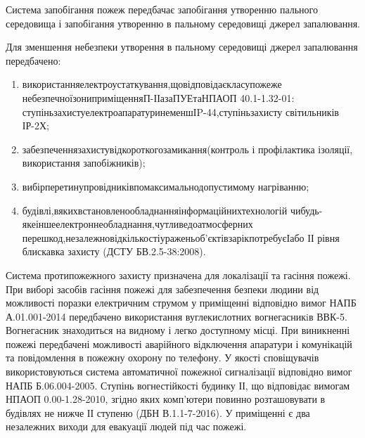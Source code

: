 Система запобігання пожеж передбачає запобігання утворенню пального середовища і запобігання утворенню в пальному середовищі джерел запалювання.

Для зменшення небезпеки утворення в пальному середовищі джерел запалювання передбачено:

\begin{enumerate}
	\item використання\hfill електроустаткування,\hfill що\hfill відповідає\hfill класу\hfill пожеже\newline \hspace*{-18mm} небезпечної\hfill зони\hfill приміщення\hfill П-ІІа\hfill за\hfill ПУЕ\hfill та\hfill НПАОП 40.1-1.32-01:\newline \hspace*{-18mm} ступінь\hfill захисту\hfill електроапаратури\hfill не\hfill менш\hfill ІP-44,\hfill ступінь\hfill захисту\newline \hspace*{-18mm} світильників ІР-2Х;
	\item забезпечення\hfill захисту\hfill від\hfill короткого\hfill замикання\hfill (контроль і\newline \hspace*{-18mm} профілактика ізоляції, використання запобіжників);
	\item вибір\hfill перетину\hfill провідників\hfill по\hfill максимально\hfill допустимому\newline \hspace*{-18mm} нагріванню;
	\item будівлі,\hfill в\hfill яких\hfill встановлено\hfill обладнання\hfill інформаційних\hfill технологій\newline \hspace*{-18mm} чи\hfill будь-яке\hfill інше\hfill електронне\hfill обладнання,\hfill чутливе\hfill до\hfill атмосферних\newline \hspace*{-18mm} перешкод,\hfill незалежно\hfill від\hfill кількості\hfill уражень\hfill об’єктів\hfill за\hfill рік\hfill потребує\hfill І\hfill або\newline \hspace*{-18mm} ІІ рівня блискавка захисту (ДСТУ БВ.2.5-38:2008).
\end{enumerate}

Система протипожежного захисту призначена для локалізації та гасіння пожежі. При виборі засобів гасіння пожежі для забезпечення безпеки людини від можливості поразки електричним струмом у приміщенні відповідно вимог НАПБ А.01.001-2014 передбачено використання вуглекислотних вогнегасникiв ВВК-5. Вогнегасник знаходиться на видному і легко доступному місці. При виникненні пожежі передбачені можливості аварійного відключення апаратури і комунікацій та повідомлення в пожежну охорону по телефону. У якості сповіщувачів використовуються система автоматичної пожежної сигналізації відповідно вимог НАПБ Б.06.004-2005. Ступінь вогнестійкості будинку ІІ, що відповідає вимогам НПАОП 0.00-1.28-2010, згідно яких комп’ютери повинно розташовувати в будівлях не нижче ІІ ступеню (ДБН В.1.1-7-2016). У приміщенні є два незалежних виходи для евакуації людей під час пожежі.

